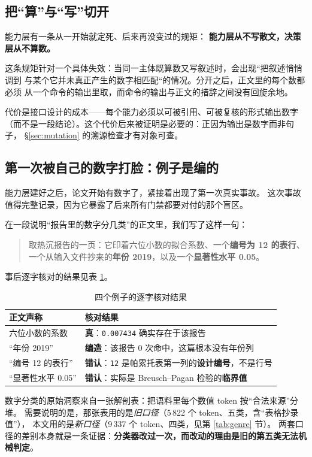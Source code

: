 \documentclass[11pt,a4paper]{article}
\newcommand{\code}[1]{\texttt{#1}}
\begin{document}
\subsection{把“算”与“写”切开}
能力层有一条从一开始就定死、后来再没变过的规矩：
\textbf{能力层从不写散文，决策层从不算数。}

这条规矩针对一个具体失效：当同一主体既算数又写叙述时，会出现“把叙述悄悄调到
与某个它并未真正产生的数字相匹配“的情况。分开之后，正文里的每个数都必须
从一个命令的输出里取，而命令的输出与正文的措辞之间没有回旋余地。

代价是接口设计的成本——每个能力必须以可被引用、可被复核的形式输出数字
（而不是一段结论）。这个代价后来被证明是必要的：正因为输出是数字而非句子，
§\ref{sec:mutation} 的溯源检查才有对象可查。

\subsection{第一次被自己的数字打脸：例子是编的}
能力层建好之后，论文开始有数字了，紧接着出现了第一次真实事故。
这次事故值得完整记录，因为它暴露了后来所有门禁都要对付的那个盲区。

在一段说明“报告里的数字分几类”的正文里，我们写了这样一句：

\begin{quote}\small
取热沉报告的一页：它印着六位小数的拟合系数、一个\textbf{编号为 12 的表行}、
一个从输入文件抄来的\textbf{年份 2019}，以及一个\textbf{显著性水平 0.05}。
\end{quote}

事后逐字核对的结果见表 \ref{tab:fabricated}。

\begin{table}[tbp]\centering\small

\caption{四个例子的逐字核对结果}\label{tab:fabricated}
\setlength{\tabcolsep}{4pt}
\begin{tabular}{p{4.2cm}p{8.2cm}}
\toprule
正文声称 & 核对结果\\
\midrule
六位小数的系数 & \textbf{真}：\code{0.007434} 确实存在于该报告\\
“年份 2019” & \textbf{编造}：该报告 0 次命中，这篇根本没有年份列\\
“编号 12 的表行” & \textbf{错认}：\code{12} 是帕累托表第一列的\textbf{设计编号}，不是行号\\
“显著性水平 0.05” & \textbf{错认}：实际是 Breusch--Pagan 检验的\textbf{临界值}\\
\bottomrule
\end{tabular}
\end{table}
数字分类的原始洞察来自一张解剖表：把语料里每个数值 token 按“合法来源”分堆。
需要说明的是，那张表用的是\emph{旧口径}（5\,822 个 token、五类，含“表格抄录值”），
本文用的是\emph{新口径}（9\,337 个 token、四类，见第 \ref{tab:genre} 节）。
两套口径的差别本身就是一条证据：\textbf{分类器改过一次，而改动的理由是旧的第五类无法机械判定}。
\end{document}
